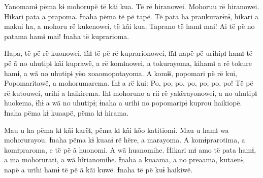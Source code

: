  

 

 

 

Yanomamɨ pëma kɨ mohorupë të kãi kua. Të rë hiranowei. Mohoruu rë
hiranowei. Hikari pata a prapoma. Ɨnaha pëma të pë tapë. Të pata ha
praukurarɨnɨ, hikari a makui ha, a mohoru rë kukenowei, të kãi kua.
Taprano të hamɨ mai! Ai të pë no patama hamɨ mai! Ɨnaha të kuprarioma. 

Hapa, të pë rë kuonowei, ɨ̃hɨ të pë rë kuprarionowei, ɨ̃hɨ napë pë urihipɨ
hamɨ të pë ã no uhutipɨ kãi kuprawë, a rë komɨnowei, a tokurayoma,
kihamɨ a rë tokure hamɨ, a wã no uhutipɨ yëo xoaomopotayoma. A komɨɨ,
popomari pë rë kui, Popomaritawë, a mohorumarema. Ɨhɨ a rë kui: Po, po,
po, po, po, po, po! Të pë rë kutouwei, urihi a haikirema. Ɨhɨ mohoruno a
rii rë yakërayonowei, a no uhutipɨ huokema, ɨ̃hɨ a wã no uhutipɨ; ɨnaha a
urihi no popomaripɨ kuprou haikiopë. Ɨnaha pëma kɨ kuaapë, pëma kɨ
hirama. 

Mau u ha pëma kɨ kãi karëɨ, pëma kɨ kãi kõo katitiomi. Mau u hamɨ wa
mohorurayou. Ɨnaha pëma kɨ kuaaɨ rë hëre, a marayoma. A komɨprarotima, a
komɨpraroma, e të pë ã huonomi. A wã huanomihe. Hikari mɨ amo të pata
hamɨ, a ma mohorurati, a wã hĩrianomihe. Ɨnaha a kuaama, a no preaama,
kutaenɨ, napë a urihi hamɨ të pë ã kãi kuwë. Ɨnaha të pë kuɨ haikiwë.

 
